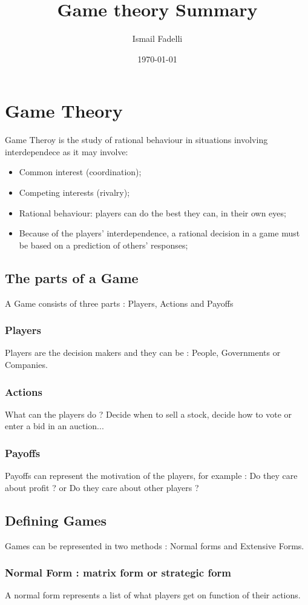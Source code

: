 \documentclass[a4paper,12pt]{article}
\begin{document}
\title{Game theory Summary}
\author{Ismail Fadelli}
\date{\today}
\maketitle

\section{Game Theory}
Game Theroy is the study of rational behaviour in situations involving interdependece as it may involve:
\begin{itemize}
\item Common interest (coordination);
\item Competing interests (rivalry);
\item Rational behaviour: players can do the best they can, in their own eyes;
\item Because of the players' interdependence, a rational decision in a game must be based on a prediction of others' responses;
\end{itemize}
\subsection{The parts of a Game} 
A Game consists of three parts : 
Players, Actions and Payoffs
\subsubsection{Players}
Players are the decision makers and they can be : People, Governments or Companies.
\subsubsection{Actions}
What can the players do ?
Decide when to sell a stock, decide how to vote or enter a bid in an auction...
\
\subsubsection{Payoffs}
Payoffs can represent the motivation of the players, for example : Do they care about profit ? or Do they care about other players ? 
\subsection{Defining Games} Games can be represented in two methods : Normal forms and Extensive Forms.
\subsubsection{Normal Form : matrix form or strategic form}
A normal form represents a list of what players get on function of their actions.
\end{document}
